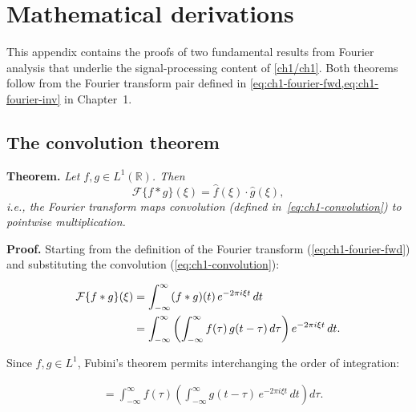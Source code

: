%

\chapter{Mathematical derivations}
\clearpage

This appendix contains the proofs of two fundamental results from
Fourier analysis that underlie the signal-processing content of
\cref{ch1/ch1}.
Both theorems follow from the Fourier transform pair defined in
\cref{eq:ch1-fourier-fwd,eq:ch1-fourier-inv} in Chapter~1.

\section{The convolution theorem}

\textbf{Theorem.}
\textit{Let $f, g \in L^{1}(\mathbb{R})$.
Then}
\begin{equation}
  \mathcal{F}\{f * g\}(\xi) = \hat{f}(\xi)\cdot\hat{g}(\xi),
  \label{eq:app-convthm}
\end{equation}
\textit{i.e., the Fourier transform maps convolution
(defined in~\eqref{eq:ch1-convolution}) to pointwise multiplication.}

\medskip
\textbf{Proof.}
Starting from the definition of the Fourier transform
(\cref{eq:ch1-fourier-fwd}) and substituting the convolution
(\cref{eq:ch1-convolution}):

\begin{align}
  \mathcal{F}\{f * g\}(\xi)
    &= \int_{-\infty}^{\infty}
         (f * g)(t)\,e^{-2\pi i\xi t}\,dt
       \label{eq:app-conv-step1} \\
    &= \int_{-\infty}^{\infty}
         \left(
           \int_{-\infty}^{\infty} f(\tau)\,g(t-\tau)\,d\tau
         \right)
         e^{-2\pi i\xi t}\,dt.
       \notag
\end{align}

Since $f, g \in L^{1}$, Fubini's theorem permits interchanging
the order of integration:

\begin{align}
  &= \int_{-\infty}^{\infty} f(\tau)
       \left(
         \int_{-\infty}^{\infty} g(t-\tau)\,
         e^{-2\pi i\xi t}\,dt
       \right) d\tau.
     \label{eq:app-conv-fubini}
\end{align}

